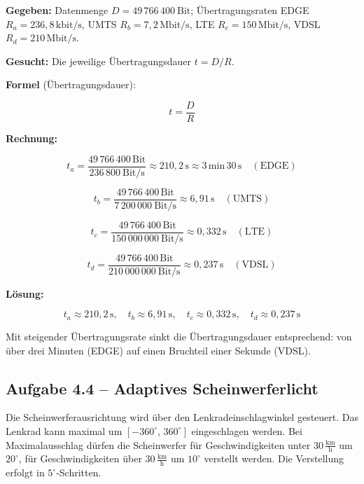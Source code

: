 \begin{beispiel}

\textbf{Gegeben:} Datenmenge $D = 49\,766\,400\ \text{Bit}$; Übertragungsraten
EDGE $R_a = 236{,}8\,\text{kbit/s}$, UMTS $R_b = 7{,}2\,\text{Mbit/s}$, LTE
$R_c = 150\,\text{Mbit/s}$, VDSL $R_d = 210\,\text{Mbit/s}$.

\textbf{Gesucht:} Die jeweilige Übertragungsdauer $t = D / R$.

\textbf{Formel} (Übertragungsdauer):

$$
t = \frac{D}{R}
$$

\textbf{Rechnung:}

$$
t_a = \frac{49\,766\,400\,\text{Bit}}{236\,800\ \text{Bit/s}} \approx 210{,}2\,\text{s}
    \approx 3\,\text{min}\,30\,\text{s} \quad (\text{EDGE})
$$

$$
t_b = \frac{49\,766\,400\,\text{Bit}}{7\,200\,000\ \text{Bit/s}} \approx 6{,}91\,\text{s}
    \quad (\text{UMTS})
$$

$$
t_c = \frac{49\,766\,400\,\text{Bit}}{150\,000\,000\ \text{Bit/s}} \approx 0{,}332\,\text{s}
    \quad (\text{LTE})
$$

$$
t_d = \frac{49\,766\,400\,\text{Bit}}{210\,000\,000\ \text{Bit/s}} \approx 0{,}237\,\text{s}
    \quad (\text{VDSL})
$$

\textbf{Lösung:}

$$
\boxed{\;t_a \approx 210{,}2\,\text{s}, \quad t_b \approx 6{,}91\,\text{s}, \quad
t_c \approx 0{,}332\,\text{s}, \quad t_d \approx 0{,}237\,\text{s}\;}
$$

Mit steigender Übertragungsrate sinkt die Übertragungsdauer entsprechend: von über
drei Minuten (EDGE) auf einen Bruchteil einer Sekunde (VDSL).

\end{beispiel}


\subsection*{Aufgabe 4.4 – Adaptives Scheinwerferlicht}

Die Scheinwerferausrichtung wird über den Lenkradeinschlagwinkel gesteuert. Das
Lenkrad kann maximal um $[-360^\circ,\, 360^\circ]$ eingeschlagen werden. Bei
Maximalausschlag dürfen die Scheinwerfer für Geschwindigkeiten unter
$30\,\tfrac{\text{km}}{\text{h}}$ um $20^\circ$, für Geschwindigkeiten über
$30\,\tfrac{\text{km}}{\text{h}}$ um $10^\circ$ verstellt werden. Die Verstellung
erfolgt in $5^\circ$-Schritten.

